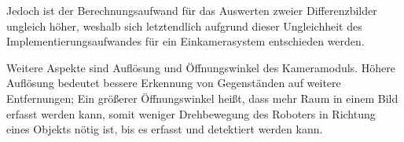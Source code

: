 Jedoch ist der Berechnungsaufwand für das Auswerten zweier Differenzbilder ungleich höher, weshalb sich letztendlich aufgrund dieser Ungleichheit des Implementierungsaufwandes für ein Einkamerasystem entschieden werden.

Weitere Aspekte sind Auflösung und Öffnungswinkel des Kameramoduls.
Höhere Auflösung bedeutet bessere Erkennung von Gegenständen auf weitere Entfernungen; Ein größerer Öffnungswinkel heißt, dass mehr Raum in einem Bild erfasst werden kann, somit weniger Drehbewegung des Roboters in Richtung eines Objekts nötig ist, bis es erfasst und detektiert werden kann.

